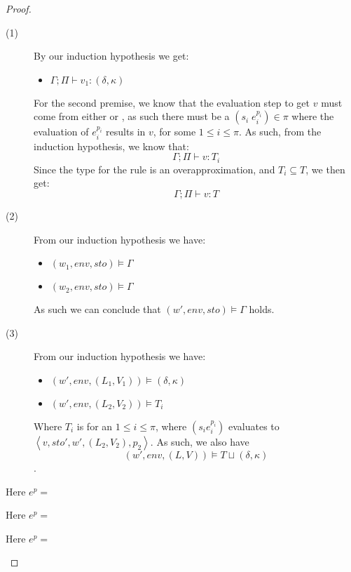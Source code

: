 \documentclass[../../master.tex]{subfiles}
\begin{document}
\begin{proof}
\begin{description}
			\begin{description}
				\item[(1)] By our induction hypothesis we get:
					\begin{itemize}
						\item $\Gamma;\Pi\vdash v_1:(\delta,\kappa)$
					\end{itemize}
						For the second premise, we know that the evaluation step to get $v$ must come from either  or , as such there must be a $(s_i\;e_i^{p_i})\in\pi$ where the evaluation of $e_i^{p_i}$ results in $v$, for some $1\leq i\leq\pi$.
						As such, from the induction hypothesis, we know that:
						$$\Gamma;\Pi\vdash v:T_i$$
						Since the type for the  rule is an overapproximation, and $T_i\subseteq T$, we then get:
						$$\Gamma;\Pi\vdash v:T$$
				\item[(2)] From our induction hypothesis we have:
					\begin{itemize}
						\item $(w_1,env,sto)\models\Gamma$
						\item $(w_2,env,sto)\models\Gamma$
					\end{itemize}
					As such we can conclude that $(w',env,sto)\models\Gamma$ holds.
				\item[(3)] From our induction hypothesis we have:
					\begin{itemize}
						\item $(w',env,(L_1,V_1))\models (\delta,\kappa)$
						\item $(w',env,(L_2,V_2))\models T_i$
					\end{itemize}
					Where $T_i$ is for an $1\leq i\leq\pi$, where $(s_i e_i^{p_i})$ evaluates to $\left\langle v,sto',w',(L_2,V_2),p_2\right\rangle$.
					As such, we also have $$(w',env,(L,V))\models T\sqcup(\delta,\kappa)$$.
			\end{description}

		\item[\runa{Match 1}] Here $e^p=$
		\item[\runa{Match 2}] Here $e^p=$
		\item[\runa{Match $\perp$}] Here $e^p=$


\end{description}
\end{proof}
\end{document}
